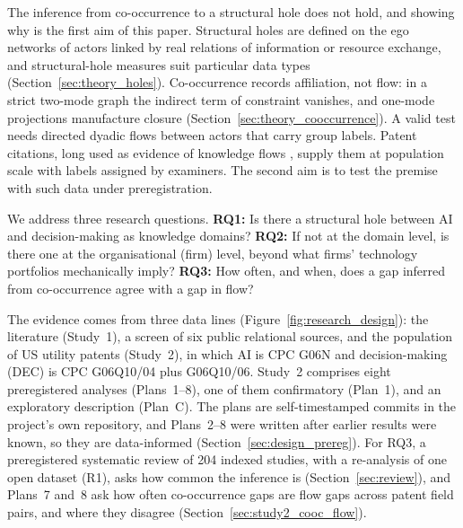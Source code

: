 The inference from co-occurrence to a structural hole does not hold, and showing why is the first aim of this paper. Structural holes are defined on the ego networks of actors linked by real relations of information or resource exchange, and structural-hole measures suit particular data types (Section~\ref{sec:theory_holes}). Co-occurrence records affiliation, not flow: in a strict two-mode graph the indirect term of constraint vanishes, and one-mode projections manufacture closure (Section~\ref{sec:theory_cooccurrence}). A valid test needs directed dyadic flows between actors that carry group labels. Patent citations, long used as evidence of knowledge flows \citep{jaffe1993geographic}, supply them at population scale with labels assigned by examiners. The second aim is to test the premise with such data under preregistration.

We address three research questions. \textbf{RQ1:} Is there a structural hole between AI and decision-making as knowledge domains? \textbf{RQ2:} If not at the domain level, is there one at the organisational (firm) level, beyond what firms' technology portfolios mechanically imply? \textbf{RQ3:} How often, and when, does a gap inferred from co-occurrence agree with a gap in flow?

The evidence comes from three data lines (Figure~\ref{fig:research_design}): the literature (Study~1), a screen of six public relational sources, and the population of US utility patents (Study~2), in which AI is CPC G06N and decision-making (DEC) is CPC G06Q10/04 plus G06Q10/06. Study~2 comprises eight preregistered analyses (Plans~1--8), one of them confirmatory (Plan~1), and an exploratory description (Plan~C). The plans are self-timestamped commits in the project's own repository, and Plans~2--8 were written after earlier results were known, so they are data-informed (Section~\ref{sec:design_prereg}). For RQ3, a preregistered systematic review of 204 indexed studies, with a re-analysis of one open dataset (R1), asks how common the inference is (Section~\ref{sec:review}), and Plans~7 and~8 ask how often co-occurrence gaps are flow gaps across patent field pairs, and where they disagree (Section~\ref{sec:study2_cooc_flow}).

